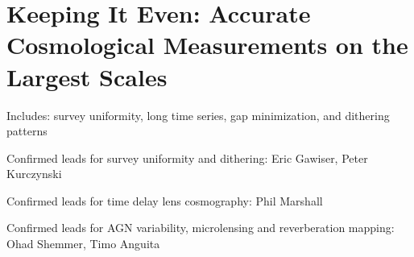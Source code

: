 \chapter[Cosmology]{Keeping It Even: Accurate Cosmological Measurements on the Largest
Scales}

Includes: survey uniformity, long time series, gap minimization, and
dithering patterns

Confirmed leads for survey uniformity and dithering: Eric Gawiser,
Peter Kurczynski

Confirmed leads for time delay lens cosmography: Phil Marshall

Confirmed leads for AGN variability, microlensing and reverberation
mapping: Ohad Shemmer, Timo Anguita
